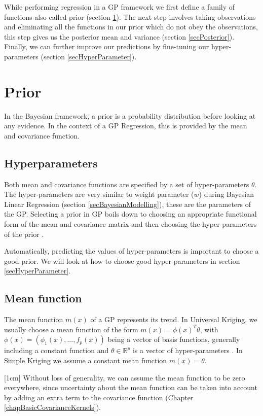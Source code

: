 While performing regression in a GP framework we first define a family of functions also called prior (section \ref{secPrior}). The next step involves taking observations and eliminating all the functions in our prior which do not obey the observations, this step gives us the posterior mean and variance (section \ref{secPosterior}). Finally, we can further improve our predictions by fine-tuning our hyper-parameters (section \ref{secHyperParameter}).

\section{Prior} \label{secPrior}
In the Bayesian framework, a prior is a probability distribution before looking at any evidence. In the context of a GP Regression, this is provided by the mean and covariance function. 

\subsection{Hyperparameters}
Both mean and covariance functions are specified by a set of hyper-parameters $\theta$. The hyper-parameters are very similar to weight parameter ($w$) during Bayesian Linear Regression (section \ref{secBayesianModelling}), these are the parameters of the GP. Selecting a prior in GP boils down to choosing an appropriate functional form of the mean and covariance matrix and then choosing the hyper-parameters of the prior \cite{duvenaud2013structure}. 

Automatically, predicting the values of hyper-parameters is important to choose a good prior. We will look at how to choose good hyper-parameters in section \ref{secHyperParameter}. 

\subsection{Mean function}\label{subSecCH2MeanFunction}
The mean function $m(x)$ of a GP represents its trend. In Universal Kriging, we usually choose a mean function of the form $m(x) = \phi(x)^{T}\theta$, with $\phi(x) = (\phi_{1}(x), \ldots , f_{p}(x))$ being a vector of basis functions, generally including a constant function and $\theta \in \mathbb{R}^{p}$ is a vector of hyper-parameters \cite{matheron1963principles}. In Simple Kriging we assume a constant mean function $m(x) = \theta$.

[1cm]
Without loss of generality, we can assume the mean function to be zero everywhere, since uncertainty about the mean function can be taken into account by adding an extra term to the covariance function (Chapter \ref{chapBasicCovarianceKernels}).  

